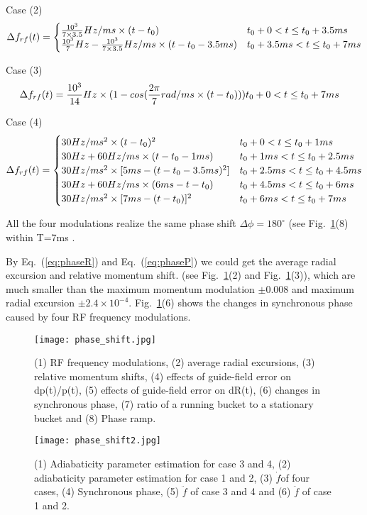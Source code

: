 Case (2) 
\begin{eqnarray}\Delta f_{rf}(t)=
\begin{cases}
\frac{10^3}{7\times 3.5}Hz/ms \times (t-t_0) &t_0+0<t\le t_0+3.5ms\cr  \frac{10^3}{7}Hz-{\frac{10^3}{7\times 3.5}Hz/ms}\times {(t-t_0-3.5ms)} &t_0+3.5ms<t\le t_0+7ms \cr 
\end{cases}
\end{eqnarray}

Case (3) 
\begin{eqnarray}\Delta f_{rf}(t)=
\frac{10^3}{14}Hz \times (1-cos(\frac{2\pi}{7} rad/ms\times (t-t_0))) &t_0+0<t\le t_0+7ms\cr  
\end{eqnarray}

Case (4) 
\begin{eqnarray}\Delta f_{rf}(t)=
\begin{cases}
30Hz/ms^2 \times (t-t_0)^2 &t_0+0<t\le t_0+1ms\cr  
30Hz + 60Hz/ms\times (t-t_0 -1ms) &t_0+1ms<t\le t_0+2.5ms\cr 
30Hz/ms^2 \times [5ms-(t-t_0-3.5ms)^2] &t_0+2.5ms<t\le t_0+4.5ms\cr  
30Hz + 60Hz/ms\times (6ms-t-t_0) &t_0+4.5ms<t\le t_0+6ms\cr  
30Hz/ms^2 \times [7ms-(t-t_0)]^2 &t_0+6ms<t\le t_0+7ms\cr  
\end{cases}
\end{eqnarray}

All the four modulations realize the same phase shift $\Delta \phi = 180^\circ $ (see Fig.~\ref{phaseshift}(8) within T=7ms . 

By Eq.~(\ref{eq:phaseR}) and Eq.~(\ref{eq:phaseP}) we could get the average radial excursion and relative momentum shift. (see Fig.~\ref{phaseshift}(2) and Fig.~\ref{phaseshift}(3)), which are much smaller than the maximum momentum modulation $\pm 0.008$ and maximum radial excursion $\pm 2.4\times10^{-4}$. Fig.~\ref{phaseshift}(6) shows the changes in synchronous phase caused by four RF frequency modulations.

\begin{figure}[!htb]
   \centering
   \texttt{[image: phase\_shift.jpg]}
   \caption{ (1) RF frequency modulations, (2) average radial excursions, (3) relative momentum shifts, (4) effects of guide-field error on dp(t)/p(t), (5) effects of guide-field error on dR(t), (6) changes in synchronous phase, (7) ratio of a running bucket to a stationary bucket and (8) Phase ramp.}
   \label{phaseshift}
\end{figure}

\begin{figure}[!htb]
   \centering
   \texttt{[image: phase\_shift2.jpg]}
   \caption{ (1)  Adiabaticity parameter estimation for case 3 and 4, (2)  adiabaticity parameter estimation for case 1 and 2, (3) $\dot f$of four cases, (4)  Synchronous phase, (5) $\ddot f$ of case 3 and 4 and (6)  $\ddot f$ of case 1 and 2.}
   \label{phaseshift2}
\end{figure}

